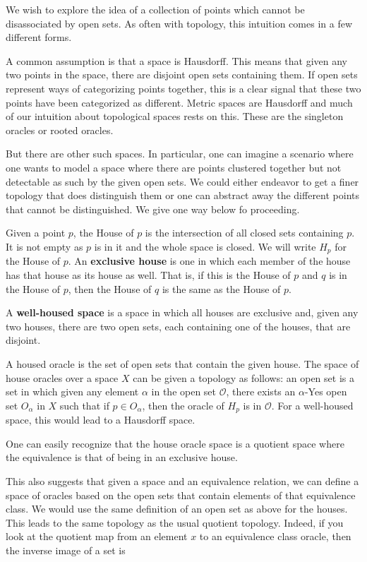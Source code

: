 \documentclass[12pt]{article}
\begin{document}
We wish to explore the idea of a  collection of points which cannot be disassociated by open sets. As often with topology, this intuition comes in a few different forms. 

A common assumption is that a space is Hausdorff. This means that given any two points in the space, there are disjoint open sets containing them. If open sets represent ways of categorizing points together, this is a clear signal that these two points have been categorized as different. Metric spaces are Hausdorff and much of our intuition about topological spaces rests on this. These are the singleton oracles or rooted oracles. 

But there are other such spaces. In particular, one can imagine a scenario where one wants to model a space where there are points clustered together but not detectable as such by the given open sets. We could either endeavor to get a finer topology that does distinguish them or one can abstract away the different points that cannot be distinguished. We give one way below fo proceeding. 

Given a point $p$, the House of $p$ is the intersection of all closed sets containing $p$. It is not empty as $p$ is in it and the whole space is closed. We will write $H_p$ for the House of $p$. An \textbf{exclusive house} is one in which each member of the house has that house as its house as well. That is, if this is the House of $p$ and $q$ is in the House of $p$, then the House of $q$ is the same as the House of $p$. 

A \textbf{well-housed space} is a space in which all houses are exclusive and, given any two houses, there are two open sets, each containing one of the houses, that are disjoint. 

A housed oracle is the set of open sets that contain the given house. The space of house oracles over a space $X$ can be given a topology as follows: an open set is a set in which given any element $\alpha$ in the open set $\mathcal{O}$, there exists an $\alpha$-Yes open set $O_{\alpha}$ in $X$ such that if $p \in O_{\alpha}$, then the oracle of $H_p$ is in $\mathcal{O}$. For a well-housed space, this would lead to a Hausdorff space. 

One can easily recognize that the house oracle space is a quotient space where the equivalence is that of being in an exclusive house.  

This also suggests that given a space and an equivalence relation, we can define a space of oracles based on the open sets that contain elements of that equivalence class. We would use the same definition of an open set as above for the houses. This leads to the same topology as the usual quotient topology. Indeed, if you look at the quotient map from an element $x$ to an equivalence class oracle, then the inverse image of a set is  
\end{document}
